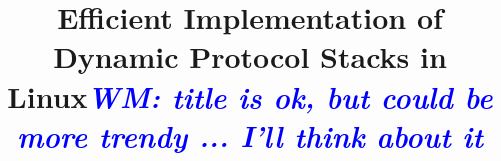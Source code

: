 \documentclass{sig-alternate}
\newcommand{\wolfgang}[1]{\textcolor{blue}{\emph{WM: #1}}}
\begin{document}
%

\title{Efficient Implementation of Dynamic Protocol Stacks in Linux\wolfgang{title is ok, but could be more trendy ... I'll think about it}}
%
%
%
%
%
\end{document}
